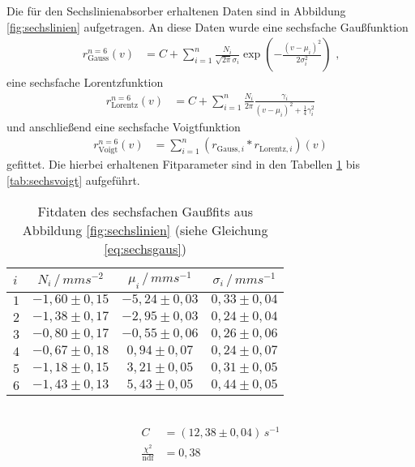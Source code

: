 Die für den Sechslinienabsorber erhaltenen Daten sind in Abbildung \ref{fig:sechslinien} aufgetragen. An diese Daten wurde eine sechsfache Gaußfunktion
\begin{align}
r_\mathrm{Gauss}^{n=6}(v)&=C+\sum_{i=1}^n\frac{N_i}{\sqrt{2\pi}\sigma_i}\exp(-\frac{(v-\mu_i)^2}{2\sigma_i^2})\text{ ,}\label{eq:sechsgaus}
\end{align}
eine sechsfache Lorentzfunktion 
\begin{align}
r_\mathrm{Lorentz}^{n=6}(v)&=C+\sum_{i=1}^n\frac{N_i}{2\pi}\frac{\gamma_i}{\left(v-\mu_i\right)^2+\frac14\gamma_i^2}\label{eq:sechslorentz}
\end{align}
und anschließend eine sechsfache Voigtfunktion 
\begin{align}
r_\mathrm{Voigt}^{n=6}(v)&=\sum_{i=1}^n\left(r_{\mathrm{Gauss}, i}*r_{\mathrm{Lorentz}, i}\right)(v)\label{eq:sechsvoigt}
\end{align}
gefittet. Die hierbei erhaltenen Fitparameter sind in den Tabellen \ref{tab:sechsgaus} bis \ref{tab:sechsvoigt} aufgeführt.

\begin{table}[h!]
	\centering
	\begin{tabular}{l|ccc}
		$i$&$N_i\,/\,\si{mms^{-2}}$&$\mu_i\,/\,\si{mms^{-1}}$&$\sigma_i\,/\,\si{mms^{-1}}$\\\hline
		$1$&$-1,60\pm0,15$&$-5,24\pm0,03$&$0,33\pm0,04$\\
		$2$&$-1,38\pm0,17$&$-2,95\pm0,03$&$0,24\pm0,04$\\
		$3$&$-0,80\pm0,17$&$-0,55\pm0,06$&$0,26\pm0,06$\\
		$4$&$-0,67\pm0,18$&$ 0,94\pm0,07$&$0,24\pm0,07$\\
		$5$&$-1,18\pm0,15$&$ 3,21\pm0,05$&$0,31\pm0,05$\\
		$6$&$-1,43\pm0,13$&$ 5,43\pm0,05$&$0,44\pm0,05$\\
	\end{tabular}\\
	\begin{align*}
		C&=(12,38\pm0,04)\,\si{s^{-1}}\\
		\frac{\chi^2}{\mathrm{ndf}}&=0,38
	\end{align*}
	\caption[Fitdaten des sechsfachen Gaußfits]{Fitdaten des sechsfachen Gaußfits aus Abbildung \ref{fig:sechslinien} (siehe Gleichung \ref{eq:sechsgaus})}
	\label{tab:sechsgaus}
\end{table}

